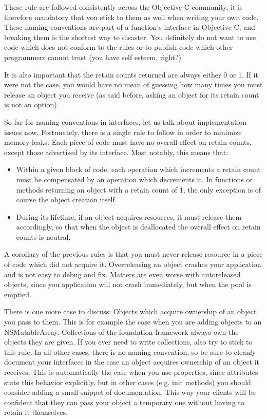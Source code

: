 These rule are followed consistently across the Objective-C community, it is therefore mandatory that you stick to them as well when writing your own code. These naming conventions are part of a function's interface in Objective-C, and breaking them is the shortest way to disaster. You definitely do not want to use code which does not conform to the rules or to publish code which other programmers cannot trust (you have self esteem, right?)

It is also important that the retain counts returned are always either 0 or 1. If it were not the case, you would have no mean of guessing how many times you must release an object you receive (as said before, asking an object for its retain count is not an option).

So far for naming conventions in interfaces, let us talk about implementation issues now. Fortunately. there is a single rule to follow in order to minimize memory leaks: Each piece of code must have no overall effect on retain counts, except those advertised by its interface. Most notably, this means that:
\begin{itemize}
\item Within a given block of code, each operation which increments a retain count must be compensated by an operation which decrements it. In functions or methods returning an object with a retain count of 1, the only exception is of course the object creation itself.
\item During its lifetime, if an object acquires resources, it must release them accordingly, so that when the object is deallocated the overall effect on retain counts is neutral.
\end{itemize}

A corollary of the previous rules is that you must never release resource in a piece of code which did not acquire it. Overreleasing an object crashes your application and is not easy to debug and fix. Matters are even worse with autoreleased objects, since you application will not crash immediately, but when the pool is emptied.

There is one more case to discuss: Objects which acquire ownership of an object you pass to them. This is for example the case when you are adding objects to an NSMutableArray. Collections of the foundation framework always own the objects they are given. If you ever need to write collections, also try to stick to this rule. In all other cases, there is no naming convention, so be sure to cleanly document your interfaces in the case an object acquires ownership of an object it receives. This is automatically the case when you use properties, since attributes state this behavior explicitly, but in other cases (e.g. init methods) you should consider adding a small snippet of documentation. This way your clients will be confident that they can pass your object a temporary one without having to retain it themselves.

